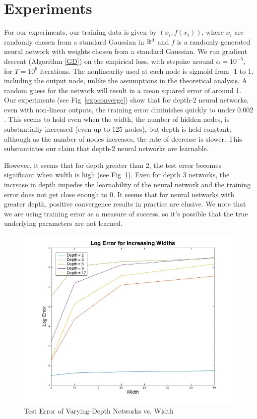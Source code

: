 

\section{Experiments}
\label{experiments}
For our experiments, our training data is given by $(x_i, f(x_i))$, where $x_i$ are randomly chosen from a standard Gaussian in ${\mathbb{R}}^d$ and $f$ is a randomly generated neural network with weights chosen from a standard Gaussian. We run gradient descent (Algorithm \ref{GD}) on the empirical loss, with stepsize around $\alpha = 10^{-5}$, for $T = 10^6$ iterations. The nonlinearity used at each node is sigmoid from -1 to 1, including the output node, unlike the assumptions in the theoretical analysis. A random guess for the network will result in a mean squared error of around 1. Our experiments (see Fig~\ref{expconverge}) show that for depth-2 neural networks, even with non-linear outputs, the training error diminishes quickly to under $0.002$. This seems to hold even when the width, the number of hidden nodes, is substantially increased (even up to 125 nodes), but depth is held constant; although as the number of nodes increases, the rate of decrease is slower. This substantiates our claim that depth-2 neural networks are learnable.

However, it seems that for depth greater than 2, the test error becomes significant  when width is high (see Fig~\ref{tablePlot}). Even for depth 3 networks, the increase in depth impedes the learnability of the neural network and the training error does not get close enough to 0. It seems that for neural networks with greater depth, positive convergence results in practice are elusive. We note that we are using training error as a measure of success, so it's possible that the true underlying parameters are not learned. 

\begin{figure}[h!]
  \centering
\includegraphics[width = 4.5in]{tablePlot.jpg}
\caption{Test Error of Varying-Depth Networks vs. Width}
\label{tablePlot}
\end{figure}

